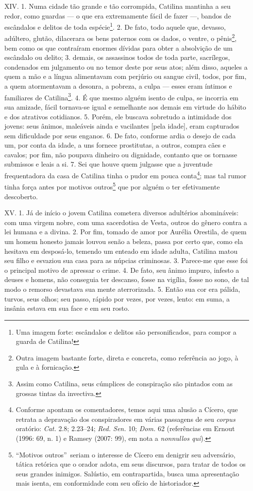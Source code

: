 XIV. 1. Numa cidade tão grande e tão corrompida, Catilina mantinha a seu redor,
como guardas --- o que era extremamente fácil de fazer ---, bandos de
escândalos e delitos de toda espécie\footnote{Uma imagem forte: escândalos e
delitos são personificados, para compor a guarda de Catilina!}. 2. De fato,
todo aquele que, devasso, adúltero, glutão, dilacerara os bens paternos com os
dados, o ventre, o pênis\footnote{Outra imagem bastante forte, direta e
concreta, como referência ao jogo, à gula e à fornicação.}, bem como os que contraíram enormes dívidas para obter a absolvição
de um escândalo ou delito; 3. demais, os assassinos todos de toda parte,
sacrílegos, condenados em julgamento ou no temor deste por seus atos; além
disso, aqueles a quem a mão e a língua alimentavam com perjúrio ou sangue
civil, todos, por fim, a quem atormentavam a desonra, a pobreza, a culpa ---
esses eram íntimos e familiares de Catilina\footnote{Assim como Catilina, seus
cúmplices de conspiração são pintados com as grossas tintas da invectiva.}. 4.
É que mesmo alguém isento de culpa, se incorria em sua amizade, fácil
tornava-se igual e semelhante aos demais em virtude do hábito e dos atrativos
cotidianos. 5. Porém, ele buscava sobretudo a intimidade dos jovens: seus
ânimos, maleáveis ainda e vacilantes [pela idade], eram capturados sem
dificuldade por seus enganos. 6. De fato, conforme ardia o desejo de cada um, 
por conta da idade, a uns fornece prostitutas, a outros, compra cães e cavalos; por
fim, não poupava dinheiro ou dignidade, contanto que os tornasse submissos e
leais a si. 7. Sei que houve quem julgasse que a juventude frequentadora da
casa de Catilina tinha o pudor em pouca conta\footnote{Conforme apontam os
comentadores, temos aqui uma alusão a Cícero, que retrata a depravação dos
conspiradores em várias passagens de seu \emph{corpus} oratório:
\emph{Cat.} 2.8; 2.23--24; \emph{Red. Sen.} 10; \emph{Dom.} 62 (referências em Ernout
(1996: 69, n. 1) e Ramsey (2007: 99), em nota a \emph{nonnullos qui}).};
mas tal rumor tinha força antes por motivos outros\footnote{``Motivos outros''\
seriam o interesse de Cícero em denigrir seu adversário, tática retórica que o
orador adota, em seus discursos, para tratar de todos os seus grandes inimigos. Salústio, em contrapartida, busca uma apresentação mais isenta, em conformidade com seu ofício de historiador.} que por
alguém o ter efetivamente descoberto.

XV. 1. Já de início o jovem Catilina cometera diversos adultérios abomináveis:
com uma virgem nobre, com uma sacerdotisa de Vesta, outros do gênero contra a
lei humana e a divina. 2. Por fim, tomado de amor por Aurélia Orestila, de quem
um homem honesto jamais louvou senão a beleza, passa por certo que, como
ela hesitava em desposá-lo, temendo um enteado em idade adulta, Catilina matou
seu filho e esvaziou sua casa para as núpcias criminosas. 3. Parece-me que esse
foi o principal motivo de apressar o crime. 4. De fato, seu ânimo impuro,
infesto a deuses e homens, não conseguia ter descanso, fosse na vigília, fosse
no sono, de tal modo o remorso devastava sua mente aterrorizada. 5. Então sua
cor era pálida, turvos, seus olhos; seu passo, rápido por vezes, por vezes,
lento: em suma, a insânia estava em sua face e em seu rosto. 


